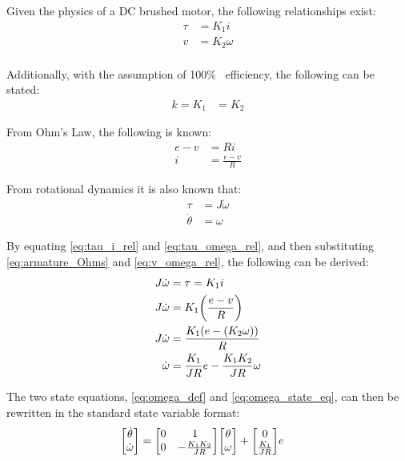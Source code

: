 \documentclass[]{article}
\begin{document}
		Given the physics of a DC brushed motor, the following relationships exist:
		\begin{align}
			\tau &= K_1 i \label{eq:tau_i_rel}\\
			v &= K_2 \omega \label{eq:v_omega_rel}\\
		\end{align}
		
		Additionally, with the assumption of 100\% \ efficiency, the following can be stated:
		\begin{align}
			k = K_1 &= K_2 \label{eq:K1_K2}
		\end{align}
		
		From Ohm's Law, the following is known:
		\begin{align}
			e - v &= Ri \nonumber\\
			i &= \frac{e-v}{R} \label{eq:armature_Ohms}
		\end{align}
		
		From rotational dynamics it is also known that:
		\begin{align}
			\tau &= J \dot{\omega} \label{eq:tau_omega_rel}\\
			\dot{\theta} &= \omega \label{eq:omega_def}
		\end{align}
		
		By equating \eqref{eq:tau_i_rel} and \eqref{eq:tau_omega_rel}, and then substituting \eqref{eq:armature_Ohms} and \eqref{eq:v_omega_rel}, the following can be derived:
		\begin{align}
			 J \dot{\omega}	&= \tau = K_1 i \nonumber\\
			 J \dot{\omega}	&= K_1 \qty(\frac{e-v}{R}) \nonumber\\
			 J \dot{\omega}	&= \frac{K_1 \qty(e - \qty(K_2 \omega))}{R} \nonumber\\
			 \dot{\omega}	&= \frac{K_1}{JR} e - \frac{K_1 K_2}{JR} \omega \label{eq:omega_state_eq}
		\end{align}
		
		The two state equations, \eqref{eq:omega_def} and \eqref{eq:omega_state_eq}, can then be rewritten in the standard state variable format:
		\begin{align}
			\mqty[	\dot{\theta}\\
					\dot{\omega}]
					&= \mqty[	0	&1\\
								0	&-\frac{K_1 K_2}{J R}]
						\mqty[	\theta\\
								\omega]
						+ \mqty[0\\
								\frac{K_1}{J R}] e \label{eq:DesignApp2_state_eq}
		\end{align}
	
\end{document}
